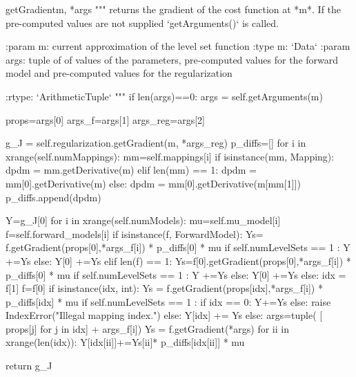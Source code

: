\begin{methoddesc}[InversionCostFunction]{getGradient}{m, *args}
        """
        returns the gradient of the cost function  at *m*.
        If the pre-computed values are not supplied `getArguments()` is called.

        :param m: current approximation of the level set function
        :type m: `Data`
        :param args: tuple of of values of the parameters, pre-computed values for the forward model and
                 pre-computed values for the regularization
                 
        :rtype: `ArithmeticTuple`
        """
        if len(args)==0:
            args = self.getArguments(m)
         
        props=args[0]
        args_f=args[1]
        args_reg=args[2]
        
        g_J = self.regularization.getGradient(m, *args_reg) 
        p_diffs=[]
        for i in xrange(self.numMappings): 
           mm=self.mappings[i]
           if isinstance(mm, Mapping):
               dpdm = mm.getDerivative(m)
           elif len(mm) == 1:
               dpdm = mm[0].getDerivative(m)
           else:
               dpdm = mm[0].getDerivative(m[mm[1]])
           p_diffs.append(dpdm)
           
        Y=g_J[0]   
        for i in xrange(self.numModels):
           mu=self.mu_model[i] 
           f=self.forward_models[i]
           if isinstance(f, ForwardModel): 
              Ys= f.getGradient(props[0],*args_f[i]) * p_diffs[0] * mu
              if self.numLevelSets == 1 :
                 Y +=Ys
              else:
                  Y[0] +=Ys
           elif len(f) == 1:
              Ys=f[0].getGradient(props[0],*args_f[i]) * p_diffs[0]  * mu
              if self.numLevelSets == 1 :
                 Y +=Ys
              else:
                  Y[0] +=Ys
           else:
              idx = f[1]
              f=f[0]
              if isinstance(idx, int):
                 Ys = f.getGradient(props[idx],*args_f[i]) * p_diffs[idx] * mu 
                 if self.numLevelSets == 1 :
                     if idx == 0:
                         Y+=Ys
                     else:
                         raise IndexError("Illegal mapping index.")
                 else:
                     Y[idx] += Ys 
              else:
                 args=tuple( [ props[j] for j in idx] + args_f[i])
                 Ys = f.getGradient(*args)
                 for ii in xrange(len(idx)):
                     Y[idx[ii]]+=Ys[ii]* p_diffs[idx[ii]]  * mu

        return g_J
\end{methoddesc}



